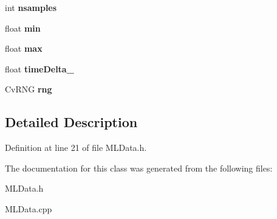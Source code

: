 \begin{DoxyCompactItemize}
\item 
\hypertarget{class_m_l_data_a27537472d2a98ab0953e4274e0eacf26}{int {\bfseries nsamples}}\label{class_m_l_data_a27537472d2a98ab0953e4274e0eacf26}

\item 
\hypertarget{class_m_l_data_aff2c694344818958df194f79569afb5e}{float {\bfseries min}}\label{class_m_l_data_aff2c694344818958df194f79569afb5e}

\item 
\hypertarget{class_m_l_data_a8ab336f56b4c3dad7f07082e7382a09e}{float {\bfseries max}}\label{class_m_l_data_a8ab336f56b4c3dad7f07082e7382a09e}

\item 
\hypertarget{class_m_l_data_a73e0cdc6a204e1ce47f732c539d23386}{float {\bfseries time\-Delta\-\_\-}}\label{class_m_l_data_a73e0cdc6a204e1ce47f732c539d23386}

\item 
\hypertarget{class_m_l_data_acbcee1e8b631c755c2093665354104f2}{\-Cv\-R\-N\-G {\bfseries rng}}\label{class_m_l_data_acbcee1e8b631c755c2093665354104f2}

\end{DoxyCompactItemize}


\subsection{\-Detailed \-Description}


\-Definition at line 21 of file \-M\-L\-Data.\-h.



\-The documentation for this class was generated from the following files\-:\begin{DoxyCompactItemize}
\item 
\-M\-L\-Data.\-h\item 
\-M\-L\-Data.\-cpp\end{DoxyCompactItemize}

